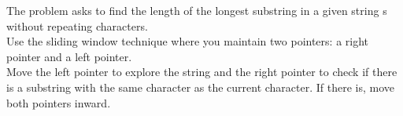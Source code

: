 \documentclass[preview]{standalone}
\begin{document}
The problem asks to find the length of the longest substring in a given string s without repeating characters.\\Use the sliding window technique where you maintain two pointers: a right pointer and a left pointer.\\Move the left pointer to explore the string and the right pointer to check if there is a substring with the same character as the current character. If there is, move both pointers inward.\\
\end{document}
